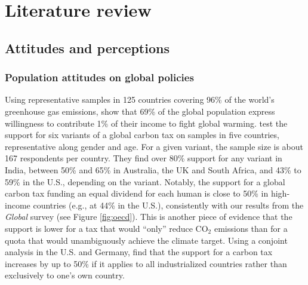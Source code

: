 \clearpage
\section{Literature review}\label{sec:literature}

\subsection{Attitudes and perceptions}\label{subsec:literature_attitudes}

\subsubsection{Population attitudes on global policies}\label{subsubsec:literature_attitudes_policies}
Using representative samples in 125 countries covering 96\% of the world's greenhouse gas emissions, \citet{andre_globally_2024} show that 69\% of the global population express willingness to contribute 1\% of their income to fight global warming. 
\citet{carattini_how_2019} test the support for six variants of a global carbon tax on samples in five countries, representative along gender and age. For a given variant, the sample size is about 167 respondents per country. They find over 80\% support for any variant in India, between 50\% and 65\% in Australia, the UK and South Africa, and 43\% to 59\% in the U.S., depending on the variant. Notably, the support for a global carbon tax funding an equal dividend for each human is close to 50\% in high-income countries (e.g., at 44\% in the U.S.), consistently with our results from the \textit{Global} survey (see Figure \ref{fig:oecd}). This is another piece of evidence that the support is lower for a tax that would ``only'' reduce CO$_\text{2}$ emissions than for a quota that would unambiguously achieve the climate target. %
Using a conjoint analysis in the U.S. and Germany, \citet{beiser-mcgrath_could_2019} find that the support for a carbon tax increases by up to 50\% %
if it applies to all industrialized countries rather than exclusively to one's own country. %

